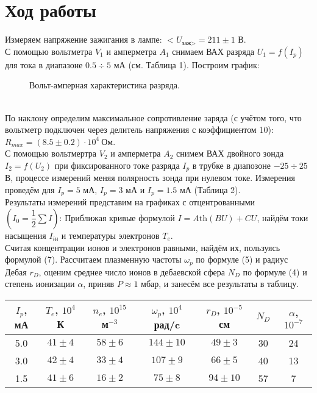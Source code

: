 \documentclass[a4paper,11pt]{extarticle} %
\begin{document}
\section*{Ход работы}
Измеряем напряжение зажигания в лампе: $<U_{\text{заж}>} = 211\pm 1$ В.\\
С помощью вольтметра $V_1$ и амперметра $A_1$ снимаем ВАХ разряда $U_1=f(I_p)$ для тока в диапазоне $0.5 \div 5$ мА (см. Таблица 1).
Построим график:\\
\begin{figure}[h]
\centering
\caption{Вольт-амперная характеристика разряда.}
\end{figure}\\
По наклону определим максимальное сопротивление заряда (с учётом того, что вольтметр подключен через делитель напряжения с коэффициентом 10): $R_{max} = (8.5\pm 0.2)\cdot 10^4~\text{Ом}$.\\
С помощью вольтмертра $V_2$ и амперметра $A_2$ снимем ВАХ двойного зонда $I_2 = f(U_2)$ при фиксированного токе разряда $I_p$ в трубке в диапозоне $-25 \div 25$ В, процессе измерений меняя полярность зонда при нулевом токе. Измерения проведём для $I_p = 5$ мА, $I_p = 3$ мА  и $I_p = 1.5$ мА (Таблица 2).\\
Результаты измерений представим на графиках с отцентрованными $\left(I_0 = \dfrac{1}{2}\sum I\right)$:
\newpage
Приближая кривые формулой $I = A \text{th}(BU) + CU$, найдём токи насыщения $I_{i\text{н}}$ и температуры электронов $T_e$.\\
Считая концентрации ионов и электронов равными, найдём их, пользуясь формулой (7). Рассчитаем плазменную частоты $\omega_p$ по формуле (5) и радиус Дебая $r_D$, оценим среднее число ионов в дебаевской сфера $N_D$ по формуле (4) и  степень ионизации $\alpha$, приняв $P\approx 1$ мбар, и занесём все результаты в таблицу.
\begin{table}[h!]
\centering
\begin{tabular}{|c|c|c|c|c|c|c|}
\hline
$I_p$, мА  & $T_e$, $10^4$ К   & $n_e$, $10^{15}$ м$^{-3}$ & $\omega_p$, $10^4$ рад/c & $r_D$, $10^{-5}$ см & $N_D$ & $\alpha$, $10^{-7}$ \\ \hline
5.0   & $41\pm 4$ & $58\pm 6$     & $144\pm 10$   & $49\pm 3$      & 30 & 24\\ \hline
3.0   & $42\pm 4$ & $33\pm 4$     & $107\pm 9$    & $66\pm 5$      & 40 & 13\\ \hline
1.5   & $41\pm 6$ & $16\pm 2$    & $75\pm 8$     & $94 \pm 10$     & 57 & 7\\ \hline
\end{tabular}
\end{table}
\newpage
\end{document}
